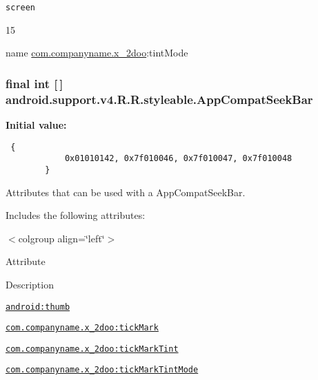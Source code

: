 {\tt screen}

15

name \hyperlink{namespacecom_1_1companyname_1_1x__2doo}{com.companyname.x\_\-2doo}:tintMode \hypertarget{classandroid_1_1support_1_1v4_1_1_r_1_1styleable_7fa9b523f74ed9ed71772420c84dee04}{
\subsubsection[{AppCompatSeekBar}]{\setlength{\rightskip}{0pt plus 5cm}final int \mbox{[}$\,$\mbox{]} android.support.v4.R.R.styleable.AppCompatSeekBar}}
\label{classandroid_1_1support_1_1v4_1_1_r_1_1styleable_7fa9b523f74ed9ed71772420c84dee04}


\textbf{Initial value:}

\begin{Code}\begin{verbatim} {
            0x01010142, 0x7f010046, 0x7f010047, 0x7f010048
        }
\end{verbatim}
\end{Code}
Attributes that can be used with a AppCompatSeekBar. 

Includes the following attributes: \begin{TabularC}{0}
\hline
\end{TabularC}
$<$colgroup align=\char`\"{}left\char`\"{}$>$ 

Attribute

Description 

{\tt \hyperlink{classandroid_1_1support_1_1v4_1_1_r_1_1styleable_b43c760130a04dcde39e22a8430f0e12}{android:thumb}}

{\tt \hyperlink{classandroid_1_1support_1_1v4_1_1_r_1_1styleable_6e0d3bf421371768beb5be26cf3f856a}{com.companyname.x\_\-2doo:tickMark}}

{\tt \hyperlink{classandroid_1_1support_1_1v4_1_1_r_1_1styleable_201e2cc7cfcab0b7c77dd7867a265808}{com.companyname.x\_\-2doo:tickMarkTint}}

{\tt \hyperlink{classandroid_1_1support_1_1v4_1_1_r_1_1styleable_768563f41000484be3e1b36b3ce945e9}{com.companyname.x\_\-2doo:tickMarkTintMode}}

